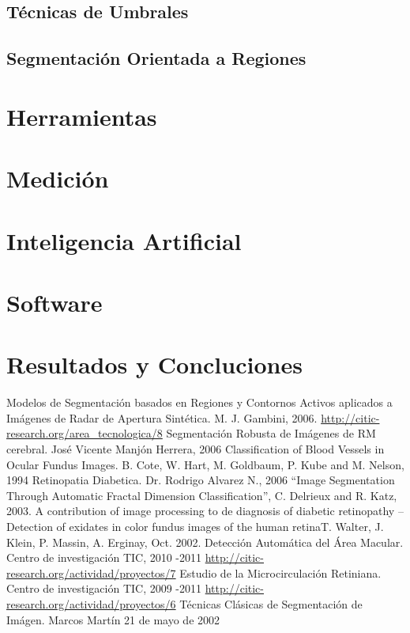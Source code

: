 \documentclass[14pt]{article}
\begin{document}
\subsection{Técnicas de Umbrales}



\subsection{Segmentación Orientada a Regiones}



\section{Herramientas}
\section{Medición}
\section{Inteligencia Artificial}
\section{Software}
\section{Resultados y Concluciones}

\newpage
\begin{thebibliography}{1}
 	  Modelos de Segmentación basados en Regiones y Contornos Activos aplicados a Imágenes de Radar de Apertura Sintética. M. J. Gambini, 2006.
 	  \url{ http://citic-research.org/area_tecnologica/8}
 	 Segmentación Robusta de Imágenes de RM cerebral. José Vicente Manjón Herrera, 2006
	 Classification of Blood Vessels in Ocular Fundus Images. B. Cote, W. Hart, M. Goldbaum, P. Kube and M. Nelson, 1994
	Retinopatia Diabetica. Dr. Rodrigo Alvarez N., 2006
	  “Image Segmentation Through Automatic Fractal Dimension Classification”, C. Delrieux and R. Katz, 2003.
	 A contribution of image processing to de diagnosis of diabetic retinopathy – Detection of exidates in color fundus images of the human retinaT. Walter, J. Klein, P. Massin, A. Erginay, Oct. 2002.
	 Detección Automática del Área Macular. Centro de investigación TIC, 2010 -2011 \url{ http://citic-research.org/actividad/proyectos/7}
	Estudio de la Microcirculación Retiniana. Centro de investigación TIC, 2009 -2011 \url{ http://citic-research.org/actividad/proyectos/6}
	 Técnicas Clásicas de Segmentación de Imágen. Marcos Martín 21 de mayo de 2002

\end{thebibliography}
\end{document}
